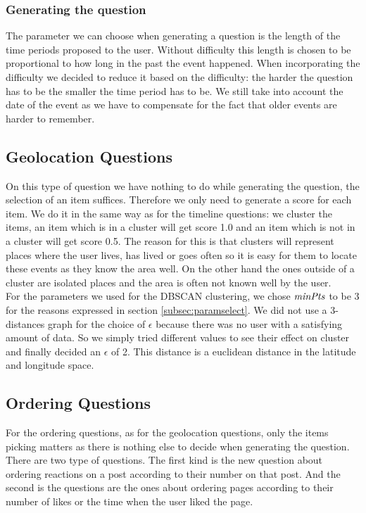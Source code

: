 \subsubsection{Generating the question}
The parameter we can choose when generating a question is the length of the time periods proposed to the user. Without difficulty this length is chosen to be proportional to how long in the past the event happened. When incorporating the difficulty we decided to reduce it based on the difficulty: the harder the question has to be the smaller the time period has to be. We still take into account the date of the event as we have to compensate for the fact that older events are harder to remember.

\subsection{Geolocation Questions}
On this type of question we have nothing to do while generating the question, the selection of an item suffices. Therefore we only need to generate a score for each item. We do it in the same way as for the timeline questions: we cluster the items, an item which is in a cluster will get score 1.0 and an item which is not in a cluster will get score 0.5. The reason for this is that clusters will represent places where the user lives, has lived or goes often so it is easy for them to locate these events as they know the area well. On the other hand the ones outside of a cluster are isolated places and the area is often not known well by the user.\\
For the parameters we used for the DBSCAN clustering, we chose $\mathit{minPts}$ to be 3 for the reasons expressed in section \ref{subsec:paramselect}. We did not use a 3-distances graph for the choice of $\epsilon$ because there was no user with a satisfying amount of data. So we simply tried different values to see their effect on cluster and finally decided an $\epsilon$ of 2. This distance is a euclidean distance in the latitude and longitude space.
\subsection{Ordering Questions}
For the ordering questions, as for the geolocation questions, only the items picking matters as there is nothing else to decide when generating the question. There are two type of questions. The first kind is the new question about ordering reactions on a post according to their number on that post. And the second is the questions are the ones about ordering pages according to their number of likes or the time when the user liked the page.
